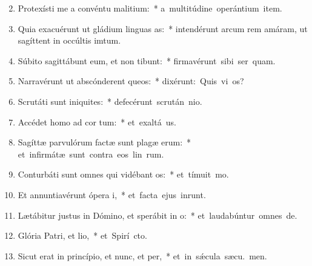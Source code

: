 \begin{flushleft}
\begin{enumerate}[leftmargin=*]
\setcounter{enumi}{1}


\item Protexísti me a convéntu malitium:~* \mbox{a multitúdine operántium item.}
\item Quia exacuérunt ut gládium linguas as:~* intendérunt arcum rem amáram, ut sagíttent in occúltis imtum.
\item Súbito sagittábunt eum, et non tibunt:~* \mbox{firmavérunt sibi ser quam.}
\item Narravérunt ut abscónderent queos:~* \mbox{dixérunt: Quis vi os?}
\item Scrutáti sunt iniquites:~* \mbox{defecérunt scrután nio.}
\item Accédet homo ad cor tum:~* \mbox{et exaltá us.}
\item Sagíttæ parvulórum factæ sunt plagæ erum:~* \mbox{et infirmátæ sunt contra eos lin rum.}
\item Conturbáti sunt omnes qui vidébant os:~* \mbox{et tímuit  mo.}
\item Et annuntiavérunt ópera i,~* \mbox{et facta ejus inrunt.}
\item Lætábitur justus in Dómino, et sperábit in o:~* \mbox{et laudabúntur omnes  de.}
\item Glória Patri, et lio,~* \mbox{et Spirí cto.}
\item Sicut erat in princípio, et nunc, et per,~* \mbox{et in s\'{\ae}cula sæcu. men.}

\end{enumerate}
\end{flushleft}

